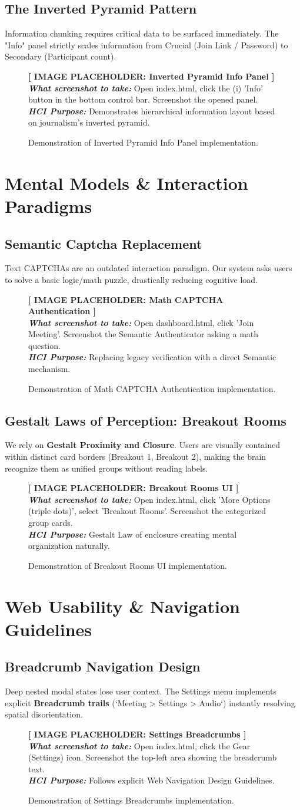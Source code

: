 \documentclass[12pt,a4paper]{article}
\newcommand{\imageplaceholder}[3]{
    \begin{figure}[H]
        \centering
        \begin{tcolorbox}[colback=placeholderbg,colframe=placeholderborder,arc=4mm,height=7.5cm,valign=center,halign=center]
            {\Large\textbf{\textcolor{hciblue}{[ IMAGE PLACEHOLDER: #1 ]}}}\\[0.5cm]
            \textit{\textbf{What screenshot to take:}} #2\\[0.3cm]
            \textit{\textbf{HCI Purpose:}} #3
        \end{tcolorbox}
        \caption{Demonstration of #1 implementation.}
    \end{figure}
}
\begin{document}
\subsection{The Inverted Pyramid Pattern}
Information chunking requires critical data to be surfaced immediately. The "Info" panel strictly scales information from Crucial (Join Link / Password) to Secondary (Participant count).
\imageplaceholder{Inverted Pyramid Info Panel}{Open index.html, click the (i) 'Info' button in the bottom control bar. Screenshot the opened panel.}{Demonstrates hierarchical information layout based on journalism's inverted pyramid.}

\section{Mental Models \& Interaction Paradigms}

\subsection{Semantic Captcha Replacement}
Text CAPTCHAs are an outdated interaction paradigm. Our system asks users to solve a basic logic/math puzzle, drastically reducing cognitive load.
\imageplaceholder{Math CAPTCHA Authentication}{Open dashboard.html, click 'Join Meeting'. Screenshot the Semantic Authenticator asking a math question.}{Replacing legacy verification with a direct Semantic mechanism.}

\subsection{Gestalt Laws of Perception: Breakout Rooms}
We rely on \textbf{Gestalt Proximity and Closure}. Users are visually contained within distinct card borders (Breakout 1, Breakout 2), making the brain recognize them as unified groups without reading labels.
\imageplaceholder{Breakout Rooms UI}{Open index.html, click 'More Options (triple dots)', select 'Breakout Rooms'. Screenshot the categorized group cards.}{Gestalt Law of enclosure creating mental organization naturally.}

\section{Web Usability \& Navigation Guidelines}

\subsection{Breadcrumb Navigation Design}
Deep nested modal states lose user context. The Settings menu implements explicit \textbf{Breadcrumb trails} (`Meeting > Settings > Audio`) instantly resolving spatial disorientation.
\imageplaceholder{Settings Breadcrumbs}{Open index.html, click the Gear (Settings) icon. Screenshot the top-left area showing the breadcrumb text.}{Follows explicit Web Navigation Design Guidelines.}
\end{document}
